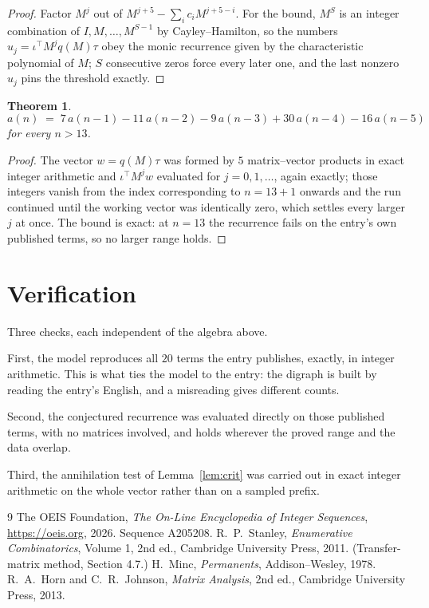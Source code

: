 \documentclass[11pt,a4paper]{article}
\theoremstyle{plain}
\newtheorem{theorem}{Theorem}
\theoremstyle{definition}
\begin{document}
\begin{proof}
Factor $M^{j}$ out of $M^{j+5}-\sum_ic_iM^{j+5-i}$. For the bound, $M^{S}$
is an integer combination of $I,M,\dots,M^{S-1}$ by Cayley--Hamilton, so the numbers
$u_j=\iota^{\!\top}M^{j}q(M)\tau$ obey the monic recurrence given by the characteristic
polynomial of $M$; $S$ consecutive zeros force every later one, and the last nonzero $u_j$
pins the threshold exactly.
\end{proof}

\begin{theorem}
\[
a(n)\;=\;7\,a(n-1) - 11\,a(n-2) - 9\,a(n-3) + 30\,a(n-4) - 16\,a(n-5)
\]
for every $n>13$.
\end{theorem}

\begin{proof}
The vector $w=q(M)\tau$ was formed by $5$ matrix--vector products in exact integer
arithmetic and $\iota^{\!\top}M^{j}w$ evaluated for $j=0,1,\dots$, again exactly; those
integers vanish from the index corresponding to $n=13+1$ onwards and the run continued
until the working vector was identically zero, which settles every larger $j$ at once. The bound is exact: at $n=13$ the recurrence fails on the entry's own published terms, so no larger range holds.
\end{proof}

\section{Verification}

Three checks, each independent of the algebra above.

First, the model reproduces all $20$ terms the entry publishes, exactly, in integer
arithmetic. This is what ties the model to the entry: the digraph is built by reading the
entry's English, and a misreading gives different counts.

Second, the conjectured recurrence was evaluated directly on those published terms, with no
matrices involved, and holds wherever the proved range and the data overlap.

Third, the annihilation test of Lemma~\ref{lem:crit} was carried out in exact integer
arithmetic on the whole vector rather than on a sampled prefix.

\begin{thebibliography}{9}
 The OEIS Foundation, \emph{The On-Line Encyclopedia of Integer
Sequences}, \url{https://oeis.org}, 2026. Sequence A205208.
 R.~P.~Stanley, \emph{Enumerative Combinatorics}, Volume 1, 2nd ed.,
Cambridge University Press, 2011. (Transfer-matrix method, Section 4.7.)
 H.~Minc, \emph{Permanents}, Addison--Wesley, 1978.
 R.~A.~Horn and C.~R.~Johnson, \emph{Matrix Analysis}, 2nd ed., Cambridge
University Press, 2013.
\end{thebibliography}
\end{document}
